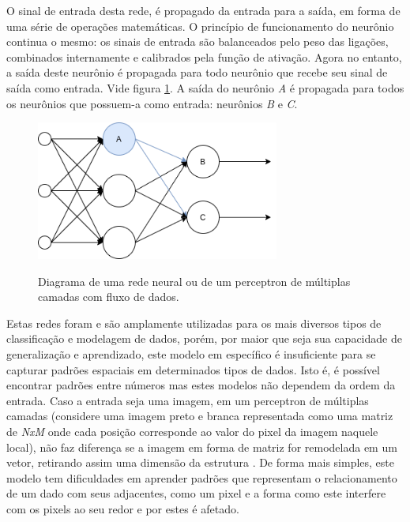  

O sinal de entrada desta rede, é propagado da entrada para a saída, em forma de uma série de operações matemáticas. O princípio de funcionamento do neurônio continua o mesmo: os sinais de entrada são balanceados pelo peso das ligações, combinados internamente e calibrados pela função de ativação. Agora no entanto, a saída deste neurônio é propagada para todo neurônio que recebe seu sinal de saída como entrada. Vide figura \ref{fig:fig3}. A saída do neurônio \textit{A} é propagada para todos os neurônios que possuem-a como entrada: neurônios \textit{B} e \textit{C}.

\begin{figure}[H]
    \centering
    \caption{Diagrama de uma rede neural ou de um perceptron de múltiplas camadas com fluxo de dados. }
    \includegraphics[width=8cm]{fig/MLP.png}
    \label{fig:fig3}
\end{figure}

Estas redes foram e são amplamente utilizadas para os mais diversos tipos de classificação e modelagem de dados, porém, por maior que seja sua capacidade de generalização e aprendizado, este modelo em específico é insuficiente para se capturar padrões espaciais em determinados tipos de dados. Isto é, é possível encontrar padrões entre números mas estes modelos não dependem da ordem da entrada. Caso a entrada seja uma imagem, em um perceptron de múltiplas camadas (considere uma imagem preto e branca representada como uma matriz de \textit{NxM} onde cada posição corresponde ao valor do pixel da imagem naquele local), não faz diferença se a imagem em forma de matriz for remodelada em um vetor, retirando assim uma dimensão da estrutura \cite{zhang_dive_2021}. De forma mais simples, este modelo tem dificuldades em aprender padrões que representam o relacionamento de um dado com seus adjacentes, como um pixel e a forma como este interfere com os pixels ao seu redor e por estes é afetado.
